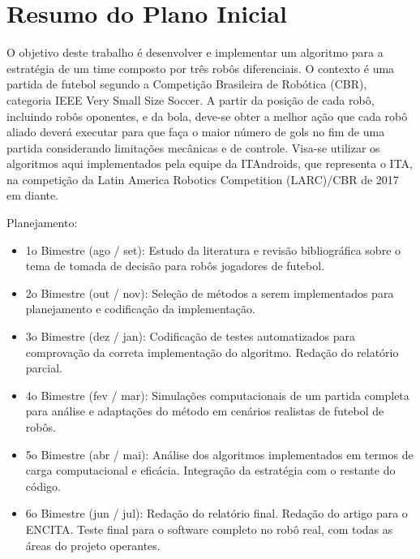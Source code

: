 \documentclass[a4paper,12pt]{article}
\begin{document}




\tableofcontents

\newpage

\section{Resumo do Plano Inicial}
\label{secao:plano_inicial}

O objetivo deste trabalho é desenvolver e implementar um algoritmo para a estratégia de um time composto por três robôs diferenciais. O contexto é uma partida de futebol segundo a Competição Brasileira de Robótica (CBR), categoria IEEE Very Small Size Soccer. A partir da posição de cada robô, incluindo robôs oponentes, e da bola, deve-se obter a melhor ação que cada robô aliado deverá executar para que faça o maior número de gols no fim de uma partida considerando limitações mecânicas e de controle. Visa-se utilizar os algoritmos aqui implementados pela equipe da ITAndroids, que representa o ITA, na competição da Latin America Robotics Competition (LARC)/CBR de 2017 em diante.

Planejamento:
\begin{itemize}

\item 1o Bimestre (ago / set): Estudo da literatura e revisão bibliográfica sobre o tema de tomada de decisão para robôs jogadores de futebol.

\item 2o Bimestre (out / nov): Seleção de métodos a serem implementados para planejamento e codificação da implementação.

\item 3o Bimestre (dez / jan): Codificação de testes automatizados para comprovação da correta implementação do algoritmo. Redação do relatório parcial.

\item 4o Bimestre (fev / mar): Simulações computacionais de um partida completa para análise e adaptações do método em cenários realistas de futebol de robôs.

\item 5o Bimestre (abr / mai): Análise dos algoritmos implementados em termos de carga computacional e eficácia. Integração da estratégia com o restante do código.

\item 6o Bimestre (jun / jul): Redação do relatório final. Redação do artigo para o ENCITA. Teste final para o software completo no robô real, com todas as áreas do projeto operantes.

\end{itemize}
\end{document}
